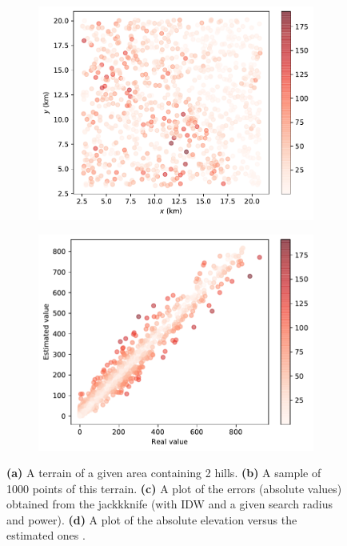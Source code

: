 \begin{figure}
\begin{subfigure}[b]{0.475\linewidth}
    \caption{}
  \end{subfigure}
  \begin{subfigure}[b]{0.45\linewidth}
    \centering
    \includegraphics[width=\textwidth]{figs/jackknife/jk3.pdf}
    \caption{}
  \end{subfigure}
  \quad
  \begin{subfigure}[b]{0.45\linewidth}
    \centering
    \includegraphics[width=\textwidth]{figs/jackknife/jk4.pdf}
    \caption{}
  \end{subfigure}
\caption{\textbf{(a)} A terrain of a given area containing 2 hills. \textbf{(b)} A sample of 1000 points of this terrain. \textbf{(c)} A plot of the errors (absolute values) obtained from the jackkknife (with IDW and a given search radius and power). \textbf{(d)} A plot of the absolute elevation versus the estimated ones .}%
\end{figure}
